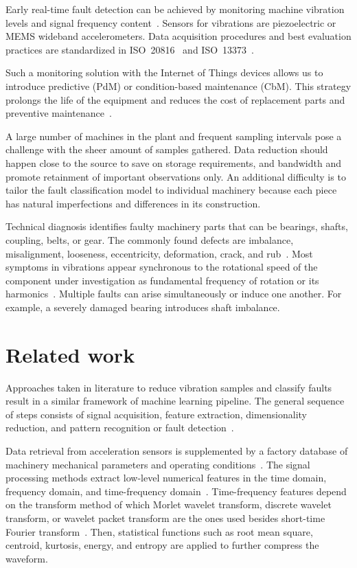 \documentclass{llncs}
\begin{document}
Early real-time fault detection can be achieved by monitoring machine vibration levels and signal frequency content~\cite{ziaran_technicka_2013}. Sensors for vibrations are piezoelectric or MEMS wideband accelerometers. Data acquisition procedures and best evaluation practices are standardized in ISO~20816~\cite{noauthor_iso_2016} and ISO~13373~\cite{noauthor_iso_2002}. 

Such a monitoring solution with the Internet of Things devices allows us to introduce predictive (PdM) or condition-based maintenance (CbM). This strategy prolongs the life of the equipment and reduces the cost of replacement parts and preventive maintenance~\cite {ziaran_technicka_2013}. 

A large number of machines in the plant and frequent sampling intervals pose a challenge with the sheer amount of samples gathered. Data reduction should happen close to the source to save on storage requirements, and bandwidth and promote retainment of important observations only. An additional difficulty is to tailor the fault classification model to individual machinery because each piece has natural imperfections and differences in its construction. 

Technical diagnosis identifies faulty machinery parts that can be bearings, shafts, coupling, belts, or gear. The commonly found defects are imbalance, misalignment, looseness, eccentricity, deformation, crack, and rub~\cite{mohanty_machinery_2015, scheffer_practical_2004}. Most symptoms in vibrations appear synchronous to the rotational speed of the component under investigation as fundamental frequency of rotation or its harmonics~\cite{davies_handbook_2012}. Multiple faults can arise simultaneously or induce one another. For example, a severely damaged bearing introduces shaft imbalance.

\section{Related work}
Approaches taken in literature to reduce vibration samples and classify faults result in a similar framework of machine learning pipeline. The general sequence of steps consists of signal acquisition, feature extraction, dimensionality reduction, and pattern recognition or fault detection~\cite{wang_bearing_2015, brito_fault_2021}. 

Data retrieval from acceleration sensors is supplemented by a factory database of machinery mechanical parameters and operating conditions~\cite{jung_vibration_2017}. The signal processing methods extract low-level numerical features in the time domain, frequency domain, and time-frequency domain~\cite{nandi_condition_2019}. Time-frequency features depend on the transform method of which Morlet wavelet transform, discrete wavelet transform, or wavelet packet transform are the ones used besides short-time Fourier transform~\cite{maurya_condition-based_2021}. Then, statistical functions such as root mean square, centroid, kurtosis, energy, and entropy are applied to further compress the waveform. 
\end{document}
